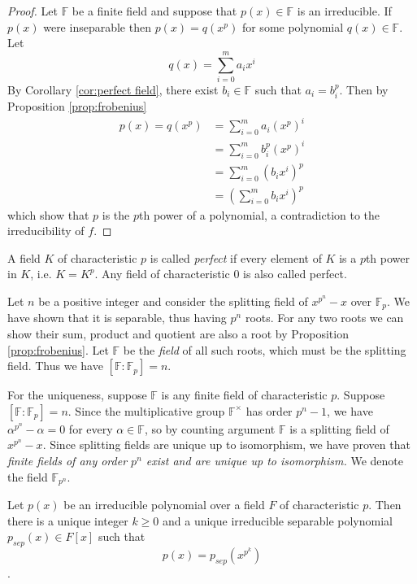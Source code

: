 \documentclass[a4paper]{article}
\begin{document}
\begin{proof}
  Let $\mathbb F$ be a finite field and suppose that $p(x)\in\mathbb F$ is an irreducible. If $p(x)$ were inseparable then $p(x)=q(x^p)$ for some polynomial $q(x)\in \mathbb F$. Let
  \[ q(x) = \sum_{i=0}^m a_i x^i \]
  By Corollary \ref{cor:perfect field}, there exist $b_i\in \mathbb F$ such that $a_i= b_i^p$. Then by Proposition \ref{prop:frobenius}
  \begin{align*}
    p(x)= q(x^p) &= \sum_{i=0}^m a_i (x^p)^i\\
                 &= \sum_{i=0}^m b_i^p (x^p)^i\\
                 &= \sum_{i=0}^m (b_i x^i)^p\\
                 &= (\sum_{i=0}^m b_i x^i)^p
  \end{align*}
  which show that $p$ is the $p$th power of a polynomial, a contradiction to the irreducibility of $f$.
\end{proof}

\begin{defi}
  A field $K$ of characteristic $p$ is called \emph{perfect} if every element of $K$ is a $p$th power in $K$, i.e. $K = K^p$. Any field of characteristic $0$ is also called perfect.
\end{defi}

\begin{eg}
  Let $n$ be a positive integer and consider the splitting field of $x^{p^n}-x$ over $\mathbb F_p$. We have shown that it is separable, thus having $p^n$ roots. For any two roots we can show their sum, product and quotient are also a root by Proposition \ref{prop:frobenius}. Let $\mathbb F$ be the \emph{field} of all such roots, which must be the splitting field. Thus we have $[\mathbb F:\mathbb F_p] = n$.

  For the uniqueness, suppose $\mathbb F$ is any finite field of characteristic $p$. Suppose $[\mathbb F:\mathbb F_p] = n$. Since the multiplicative group $\mathbb F^\times$ has order $p^n - 1$, we have $\alpha^{p^n}-\alpha=0$ for every $\alpha\in\mathbb F$, so by counting argument $\mathbb F$ is a splitting field of $x^{p^n}-x$. Since splitting fields are unique up to isomorphism, we have proven that \emph{finite fields of any order $p^n$ exist and are unique up to isomorphism.} We denote the field $\mathbb F_{p^n}$.
\end{eg}

\begin{prop}\label{prop:sep}
  Let $p(x)$ be an irreducible polynomial over a field $F$ of characteristic $p$. Then there is a unique integer $k \geq 0$ and a unique irreducible separable polynomial $p_{sep}(x)\in F[x]$ such that
  \[ p(x) = p_{sep}(x^{p^k}) \].
\end{prop}
\end{document}

